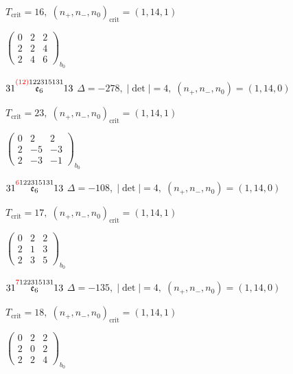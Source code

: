 \documentclass[10pt]{article}
\begin{document}
\hspace{1em}$T_{\text{crit}}=16,\; (n_+,n_-,n_0)_{\text{crit}}=(1,14,1)$

\hspace{2em}$\left(\begin{smallmatrix}0 & 2 & 2 \\ 2 & 2 & 4 \\ 2 & 4 & 6\end{smallmatrix}\right)_{\!b_0}$

$31\overset{\textcolor{red}{(12)}122315131}{\mathfrak{e}_6}13$ \quad $\Delta=-278,\; |\det|=4,\; (n_+,n_-,n_0)=(1,14,0)$

\hspace{1em}$T_{\text{crit}}=23,\; (n_+,n_-,n_0)_{\text{crit}}=(1,14,1)$

\hspace{2em}$\left(\begin{smallmatrix}0 & 2 & 2 \\ 2 & -5 & -3 \\ 2 & -3 & -1\end{smallmatrix}\right)_{\!b_0}$

$31\overset{\textcolor{red}{6}122315131}{\mathfrak{e}_6}13$ \quad $\Delta=-108,\; |\det|=4,\; (n_+,n_-,n_0)=(1,14,0)$

\hspace{1em}$T_{\text{crit}}=17,\; (n_+,n_-,n_0)_{\text{crit}}=(1,14,1)$

\hspace{2em}$\left(\begin{smallmatrix}0 & 2 & 2 \\ 2 & 1 & 3 \\ 2 & 3 & 5\end{smallmatrix}\right)_{\!b_0}$

$31\overset{\textcolor{red}{7}122315131}{\mathfrak{e}_6}13$ \quad $\Delta=-135,\; |\det|=4,\; (n_+,n_-,n_0)=(1,14,0)$

\hspace{1em}$T_{\text{crit}}=18,\; (n_+,n_-,n_0)_{\text{crit}}=(1,14,1)$

\hspace{2em}$\left(\begin{smallmatrix}0 & 2 & 2 \\ 2 & 0 & 2 \\ 2 & 2 & 4\end{smallmatrix}\right)_{\!b_0}$

\smallskip
\end{document}
